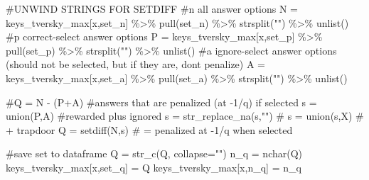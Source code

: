 \documentclass[
  letterpaper,
  DIV=11,
  numbers=noendperiod]{scrreprt}
\newenvironment{Shaded}{\begin{snugshade}}{\end{snugshade}}
\newcommand{\AttributeTok}[1]{\textcolor[rgb]{0.40,0.45,0.13}{#1}}
\newcommand{\CommentTok}[1]{\textcolor[rgb]{0.37,0.37,0.37}{#1}}
\newcommand{\FunctionTok}[1]{\textcolor[rgb]{0.28,0.35,0.67}{#1}}
\newcommand{\NormalTok}[1]{\textcolor[rgb]{0.00,0.23,0.31}{#1}}
\newcommand{\OtherTok}[1]{\textcolor[rgb]{0.00,0.23,0.31}{#1}}
\newcommand{\SpecialCharTok}[1]{\textcolor[rgb]{0.37,0.37,0.37}{#1}}
\newcommand{\StringTok}[1]{\textcolor[rgb]{0.13,0.47,0.30}{#1}}
\begin{document}
\begin{Shaded}
\begin{Highlighting}[]
  \CommentTok{\#UNWIND STRINGS FOR SETDIFF}
  \CommentTok{\#n all answer options}
\NormalTok{  N }\OtherTok{=}\NormalTok{ keys\_tversky\_max[x,}\StringTok{\textquotesingle{}set\_n\textquotesingle{}}\NormalTok{] }\SpecialCharTok{\%\textgreater{}\%} \FunctionTok{pull}\NormalTok{(set\_n) }\SpecialCharTok{\%\textgreater{}\%} \FunctionTok{strsplit}\NormalTok{(}\StringTok{""}\NormalTok{) }\SpecialCharTok{\%\textgreater{}\%} \FunctionTok{unlist}\NormalTok{()}
  \CommentTok{\#p correct{-}select answer options}
\NormalTok{  P }\OtherTok{=}\NormalTok{ keys\_tversky\_max[x,}\StringTok{\textquotesingle{}set\_p\textquotesingle{}}\NormalTok{] }\SpecialCharTok{\%\textgreater{}\%} \FunctionTok{pull}\NormalTok{(set\_p) }\SpecialCharTok{\%\textgreater{}\%} \FunctionTok{strsplit}\NormalTok{(}\StringTok{""}\NormalTok{) }\SpecialCharTok{\%\textgreater{}\%} \FunctionTok{unlist}\NormalTok{()}
  \CommentTok{\#a ignore{-}select answer options (should not be selected, but if they are, don\textquotesingle{}t penalize)}
\NormalTok{  A }\OtherTok{=}\NormalTok{ keys\_tversky\_max[x,}\StringTok{\textquotesingle{}set\_a\textquotesingle{}}\NormalTok{] }\SpecialCharTok{\%\textgreater{}\%} \FunctionTok{pull}\NormalTok{(set\_a) }\SpecialCharTok{\%\textgreater{}\%} \FunctionTok{strsplit}\NormalTok{(}\StringTok{""}\NormalTok{) }\SpecialCharTok{\%\textgreater{}\%} \FunctionTok{unlist}\NormalTok{()}
  
  \CommentTok{\#Q = N {-} (P+A)}
  \CommentTok{\#answers that are penalized (at {-}1/q) if selected }
\NormalTok{  s }\OtherTok{=} \FunctionTok{union}\NormalTok{(P,A) }\CommentTok{\#rewarded plus ignored }
\NormalTok{  s }\OtherTok{=} \FunctionTok{str\_replace\_na}\NormalTok{(s,}\StringTok{""}\NormalTok{)}
  \CommentTok{\# s = union(s,X) \# + trapdoor }
\NormalTok{  Q }\OtherTok{=} \FunctionTok{setdiff}\NormalTok{(N,s) }\CommentTok{\# = penalized at {-}1/q when selected }
  
  \CommentTok{\#save set to dataframe}
\NormalTok{  Q }\OtherTok{=} \FunctionTok{str\_c}\NormalTok{(Q, }\AttributeTok{collapse=}\StringTok{""}\NormalTok{)}
\NormalTok{  n\_q }\OtherTok{=} \FunctionTok{nchar}\NormalTok{(Q)}
\NormalTok{  keys\_tversky\_max[x,}\StringTok{\textquotesingle{}set\_q\textquotesingle{}}\NormalTok{] }\OtherTok{=}\NormalTok{ Q}
\NormalTok{  keys\_tversky\_max[x,}\StringTok{\textquotesingle{}n\_q\textquotesingle{}}\NormalTok{] }\OtherTok{=}\NormalTok{ n\_q}
  

\end{Highlighting}
\end{Shaded}
\end{document}
